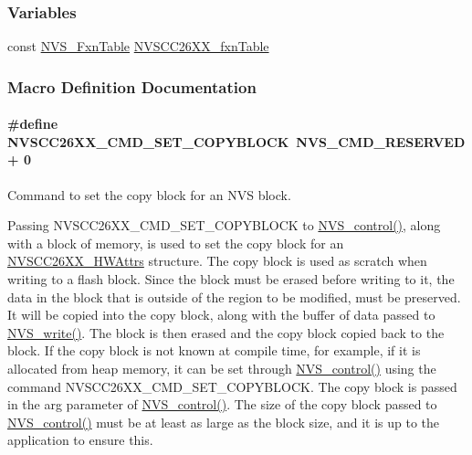 \subsubsection*{Variables}
\begin{DoxyCompactItemize}
\item 
const \hyperlink{struct_n_v_s___fxn_table}{N\+V\+S\+\_\+\+Fxn\+Table} \hyperlink{_n_v_s_c_c26_x_x_8h_ade3114c185df6a15ec62305dd5c6f6cc}{N\+V\+S\+C\+C26\+X\+X\+\_\+fxn\+Table}
\end{DoxyCompactItemize}


\subsubsection{Macro Definition Documentation}
\paragraph[{N\+V\+S\+C\+C26\+X\+X\+\_\+\+C\+M\+D\+\_\+\+S\+E\+T\+\_\+\+C\+O\+P\+Y\+B\+L\+O\+C\+K}]{\setlength{\rightskip}{0pt plus 5cm}\#define N\+V\+S\+C\+C26\+X\+X\+\_\+\+C\+M\+D\+\_\+\+S\+E\+T\+\_\+\+C\+O\+P\+Y\+B\+L\+O\+C\+K~{\bf N\+V\+S\+\_\+\+C\+M\+D\+\_\+\+R\+E\+S\+E\+R\+V\+E\+D} + 0}\label{_n_v_s_c_c26_x_x_8h_a6298f92f68199f11a797668f42342a7f}


Command to set the copy block for an N\+V\+S block. 

Passing N\+V\+S\+C\+C26\+X\+X\+\_\+\+C\+M\+D\+\_\+\+S\+E\+T\+\_\+\+C\+O\+P\+Y\+B\+L\+O\+C\+K to \hyperlink{_n_v_s_8h_adb26bd05e4f063191411ac5ad968b1d9}{N\+V\+S\+\_\+control()}, along with a block of memory, is used to set the copy block for an \hyperlink{struct_n_v_s_c_c26_x_x___h_w_attrs}{N\+V\+S\+C\+C26\+X\+X\+\_\+\+H\+W\+Attrs} structure. The copy block is used as scratch when writing to a flash block. Since the block must be erased before writing to it, the data in the block that is outside of the region to be modified, must be preserved. It will be copied into the copy block, along with the buffer of data passed to \hyperlink{_n_v_s_8h_a2c0acbdec0a65dc725019adb65ad282a}{N\+V\+S\+\_\+write()}. The block is then erased and the copy block copied back to the block. If the copy block is not known at compile time, for example, if it is allocated from heap memory, it can be set through \hyperlink{_n_v_s_8h_adb26bd05e4f063191411ac5ad968b1d9}{N\+V\+S\+\_\+control()} using the command N\+V\+S\+C\+C26\+X\+X\+\_\+\+C\+M\+D\+\_\+\+S\+E\+T\+\_\+\+C\+O\+P\+Y\+B\+L\+O\+C\+K. The copy block is passed in the arg parameter of \hyperlink{_n_v_s_8h_adb26bd05e4f063191411ac5ad968b1d9}{N\+V\+S\+\_\+control()}. The size of the copy block passed to \hyperlink{_n_v_s_8h_adb26bd05e4f063191411ac5ad968b1d9}{N\+V\+S\+\_\+control()} must be at least as large as the block size, and it is up to the application to ensure this.

